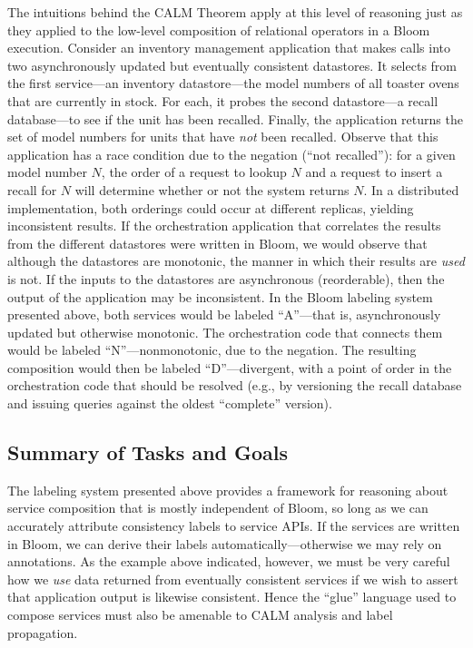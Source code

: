 The intuitions behind the CALM Theorem apply at this level of reasoning
just as they applied to the low-level composition of relational operators
in a Bloom execution.  Consider an inventory management application 
that makes calls into two asynchronously updated but
eventually consistent datastores.  It selects from the first service---an 
inventory datastore---the model numbers of all toaster ovens that are currently in stock.  For each, it probes the second datastore---a recall database---to
see if the unit has been recalled.  Finally, the application returns the 
set of model numbers for units that have \emph{not} been recalled.  Observe that this
application has a race condition due to the negation (``not recalled''): for a given model number $N$, the order of a request to lookup $N$ and a request to insert a recall for $N$ will determine whether or not the system returns $N$.  In a distributed implementation, both orderings could occur at different replicas, yielding inconsistent results.  If the orchestration
application that correlates the results from the different datastores were written in Bloom, we would observe that although the datastores are monotonic, 
the manner in which their results are \emph{used} is not.  If the inputs to 
the datastores are asynchronous (reorderable), then the output of the 
application may be inconsistent.  In the Bloom labeling system presented above, both services would be labeled 
``A''---that is, asynchronously updated but otherwise monotonic.  The orchestration code that connects them would be 
labeled ``N''---nonmonotonic, due to the negation.  The resulting composition would then be labeled ``D''---divergent, with
a point of order in the orchestration code that should be resolved (e.g., by versioning the recall database and issuing queries against the 
oldest ``complete'' version).


\subsection{Summary of Tasks and Goals}

The labeling system presented above provides a framework for reasoning about service composition that is 
mostly independent of Bloom, so long as we can accurately attribute consistency labels to service APIs.
If the services are written in Bloom, we can derive their labels automatically---otherwise we may rely on annotations.
As the example above indicated, however, we must be very careful how we \emph{use} data returned from 
eventually consistent services
if we wish to assert that application output is likewise consistent.  Hence the ``glue'' language used
to compose services must also be amenable to CALM analysis and label propagation.

